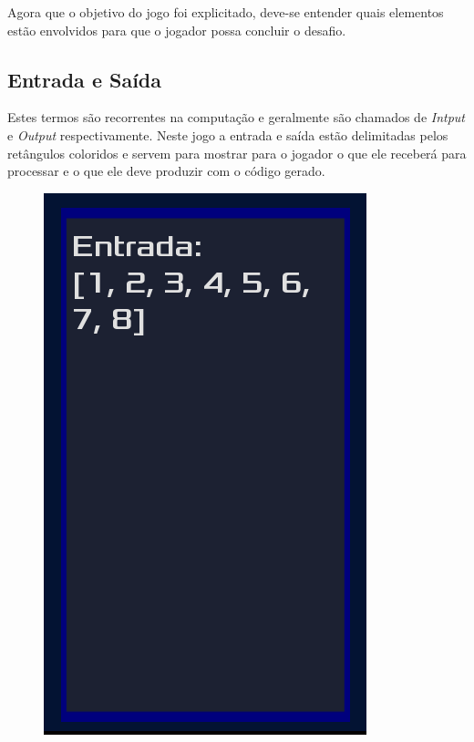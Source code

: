 Agora que o objetivo do jogo foi explicitado, deve-se entender quais elementos 
estão envolvidos para que o jogador possa concluir o desafio.

\subsection{Entrada e Saída}

Estes termos são recorrentes na computação e geralmente são chamados de
\textit{Intput} e \textit{Output} respectivamente. Neste jogo a entrada e saída
estão delimitadas pelos retângulos coloridos e servem para mostrar para o 
jogador o que ele receberá para processar e o que ele deve produzir com o código
gerado.

\begin{figure}
    \centering
    \begin{minipage}{.4\textwidth}
      \centering
      \includegraphics[scale=0.3]{../figuras/exemplo_entrada.png}
    \end{minipage}%
    \begin{minipage}{.4\textwidth}
      \centering

\end{minipage}
\end{figure}
